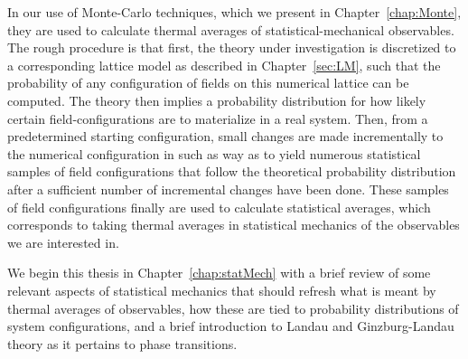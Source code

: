 In our use of Monte-Carlo techniques, which we present in Chapter~\ref{chap:Monte}, they are used
to calculate thermal averages of statistical-mechanical
observables. The rough procedure is that first, the theory under investigation is discretized to a corresponding lattice model as described in Chapter~\ref{sec:LM},
such that the probability of any configuration of fields on this numerical lattice can be computed. The theory then implies a probability distribution for how
likely certain field-configurations are to materialize in a real system.
Then, from a predetermined starting configuration, small changes are made incrementally to the numerical configuration in such
as way as to yield numerous statistical samples of field configurations that follow the theoretical probability distribution after a sufficient number of
incremental changes have been done. These samples of field configurations finally are used to calculate statistical averages, which corresponds to taking
thermal averages in statistical mechanics of the observables we are interested in. 

We begin this thesis in Chapter~\ref{chap:statMech} with a brief review
of some relevant aspects of statistical mechanics that should refresh what is meant by thermal averages of observables, how these are tied to probability
distributions of system configurations, and a brief introduction to Landau and Ginzburg-Landau theory as it pertains to phase transitions.


